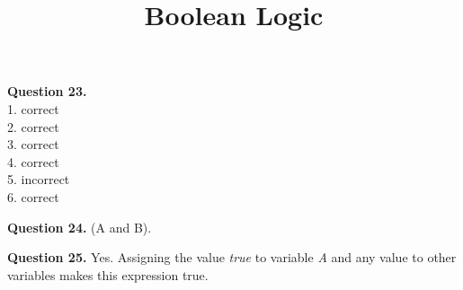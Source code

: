 \documentclass{ximera}
\title{Boolean Logic}
\begin{document}
\maketitle

\textbf{Question 23.} \\
1. correct \\
2. correct \\
3. correct \\
4. correct \\
5. incorrect \\
6. correct 

\textbf{Question 24.} (A and B).

\textbf{Question 25.} Yes. Assigning the value \emph{true} to variable \emph{A} and any value to other variables makes this expression true. 
\end{document}
